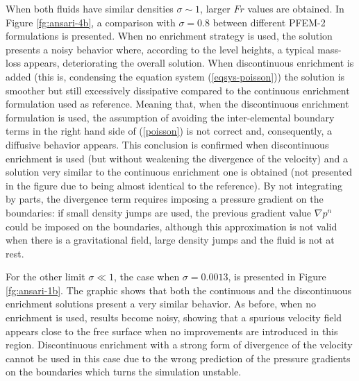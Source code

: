 When both fluids have similar densities $\sigma \sim 1$, larger $Fr$ values are obtained. In Figure \ref{fg:ansari-4b}, a comparison with $\sigma=0.8$ between different PFEM-2 formulations is presented. When no enrichment strategy is used, the solution presents a noisy behavior where, according to the level heights, a typical mass-loss appears, deteriorating the overall solution. When discontinuous enrichment is added (this is, condensing the equation system (\ref{eqsys-poisson})) the solution is smoother but still excessively dissipative compared to the continuous enrichment formulation used as reference. Meaning that, when the discontinuous enrichment formulation is used, the assumption of avoiding the inter-elemental boundary terms in the right hand side of (\ref{poisson}) is not correct and, consequently, a diffusive behavior appears. This conclusion is confirmed when discontinuous enrichment is used (but without weakening the divergence of the velocity) and a solution very similar to the continuous enrichment one is obtained (not presented in the figure due to being almost identical to the reference). By not integrating by parts, the divergence term requires imposing a pressure gradient on the boundaries: if small density jumps are used, the previous gradient value $\nabla p^n$ could be imposed on the boundaries, although this approximation is not valid when there is a gravitational field, large density jumps and the fluid is not at rest.


For the other limit $\sigma \ll 1$, the case when $\sigma=0.0013$, is presented in Figure \ref{fg:ansari-1b}. The graphic shows that both the continuous and the discontinuous enrichment solutions present a very similar behavior. As before, when no enrichment is used, results become noisy, showing that a spurious velocity field appears close to the free surface when no improvements are introduced in this region. Discontinuous enrichment with a strong form of divergence of the velocity cannot be used in this case due to the wrong prediction of the pressure gradients on the boundaries which turns the simulation unstable.

